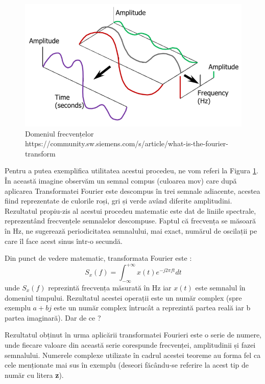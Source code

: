 \documentclass[a4paper,12pt]{report}
\begin{document}
	\begin{figure}[H]
		\includegraphics[scale=0.7]{images/FT_time_to_freq}
		\caption{Domeniul frecvențelor \newline
			\hspace{\linewidth}https://community.sw.siemens.com/s/article/what-is-the-fourier-transform}
		\label{fig:signal_to_freq}
	\end{figure}
	
	Pentru a putea exemplifica utilitatea acestui procedeu, ne vom referi la Figura \ref{fig:signal_to_freq}. În această imagine observăm un semnal compus (culoarea mov) care după aplicarea Transformatei Fourier este descompus în trei semnale adiacente, acestea fiind reprezentate de culorile roși, gri și verde având diferite amplitudini. Rezultatul propiu-zis al acestui procedeu matematic este dat de liniile spectrale, reprezentând frecvențele semnalelor descompuse. Faptul că frecvența se măsoară în Hz, ne sugerează periodicitatea semnalului, mai exact, numărul de oscilații pe care îl face acest sinus într-o secundă.
	
	Din punct de vedere matematic, transformata Fourier este :
	\begin{equation}
		\label{ft_equation}
		S_x(f) = \int_{-\infty}^{+\infty} x(t)e^{-j2 \pi ft} dt
	\end{equation}
	unde $S_x(f)$ reprezintă frecvența măsurată în Hz iar $x(t)$ este semnalul în domeniul timpului. Rezultatul acestei operații este un număr complex (spre exemplu $a + bj$ este un număr complex întrucât a reprezintă partea reală iar b partea imaginară). Dar de ce ?
	
	Rezultatul obținut în urma aplicării transformatei Fourieri este o serie de numere, unde fiecare valoare din această serie corespunde frecvenței, amplitudinii și fazei semnalului. Numerele complexe utilizate în cadrul acestei teoreme au forma fel ca cele menționate mai sus în exemplu (deseori făcându-se referire la acest tip de număr cu litera \textbf{z}).
	
\end{document}
